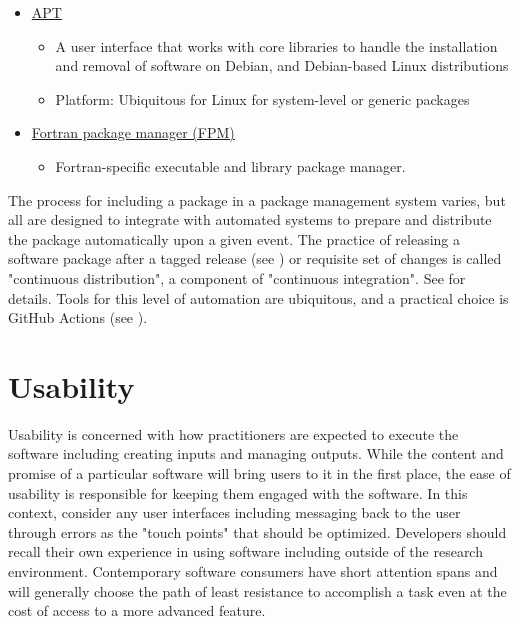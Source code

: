\documentclass[]{nrel}
\begin{document}
\begin{itemize}
\item \href{https://en.wikipedia.org/wiki/APT\_(software)}{APT}
\begin{itemize}
\item A user interface that works with core libraries to handle the installation and removal of software on Debian, and Debian-based Linux distributions
\item Platform: Ubiquitous for Linux for system-level or generic packages
\end{itemize}

\item \href{https://fpm.fortran-lang.org/index.html}{Fortran package manager (FPM)}
\begin{itemize}
\item Fortran-specific executable and library package manager.
\end{itemize}

\end{itemize}

The process for including a package in a package management system varies, but all are designed
to integrate with automated systems to prepare and distribute the package automatically upon
a given event. The practice of releasing a software package after a tagged release
(see ) or requisite set of changes is called "continuous distribution",
a component of "continuous integration". See  for details.
Tools for this level of automation are ubiquitous, and a practical choice
is GitHub Actions (see ).


\chapter{Usability}
\label{sec:usability}
Usability is concerned with how practitioners are expected to execute the software including
creating inputs and managing outputs.
While the content and promise of a particular software will bring users to it in the first
place, the ease of usability is responsible for keeping them engaged with the software.
In this context, consider any user interfaces including messaging back to the user through
errors as the "touch points" that should be optimized.
Developers should recall their own experience in using software including outside
of the research environment.
Contemporary software consumers have short attention spans and will generally choose
the path of least resistance to accomplish a task even at the cost of access to a more
advanced feature.
\end{document}
